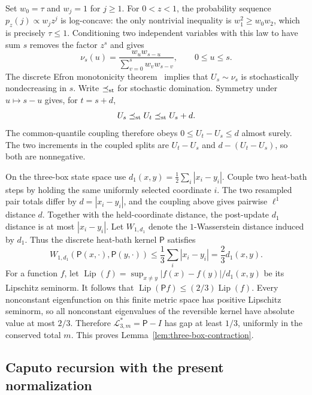 Set $w_0=\tau$ and $w_j=1$ for $j\geq1$.  For $0<z<1$, the probability
sequence $p_z(j)\propto w_jz^j$ is log-concave: the only nontrivial
inequality is $w_1^2\geq w_0w_2$, which is precisely $\tau\leq1$.
Conditioning two independent variables with this law to have sum $s$
removes the factor $z^s$ and gives
\begin{equation}
 \nu_s(u)=\frac{w_u w_{s-u}}
 {\sum_{v=0}^s w_v w_{s-v}},
 \qquad0\leq u\leq s.
 \label{eq:app-split-law}
\end{equation}
The discrete Efron monotonicity theorem~\cite{Efron1965} implies that
$U_s\sim\nu_s$ is stochastically nondecreasing in $s$.  Write
$\preceq_{\rm st}$ for stochastic domination.  Symmetry under
$u\mapsto s-u$ gives, for $t=s+d$,
\begin{equation}
 U_s\preceq_{\rm st}U_t\preceq_{\rm st}U_s+d.
 \label{eq:app-bounded-stochastic-order}
\end{equation}
The common-quantile coupling therefore obeys
$0\leq U_t-U_s\leq d$ almost surely.  The two increments in the coupled
splits are $U_t-U_s$ and $d-(U_t-U_s)$, so both are nonnegative.

On the three-box state space use
$d_1(x,y)=\frac12\sum_i|x_i-y_i|$.  Couple two heat-bath steps by holding
the same uniformly selected coordinate $i$.  The two resampled pair totals
differ by $d=|x_i-y_i|$, and the coupling above gives pairwise
$\ell^1$ distance $d$.  Together with the held-coordinate distance, the
post-update $d_1$ distance is at most $|x_i-y_i|$.  Let $W_{1,d_1}$ denote
the $1$-Wasserstein distance induced by $d_1$.  Thus the discrete heat-bath
kernel $\mathsf P$ satisfies
\begin{equation}
 W_{1,d_1}(\mathsf P(x,\cdot),\mathsf P(y,\cdot))
 \leq\frac13\sum_i|x_i-y_i|=\frac23d_1(x,y).
 \label{eq:app-three-box-wasserstein}
\end{equation}
For a function $f$, let $\operatorname{Lip}(f)
=\sup_{x\ne y}|f(x)-f(y)|/d_1(x,y)$ be its Lipschitz seminorm.  It follows
that $\operatorname{Lip}(\mathsf Pf)\leq(2/3)\operatorname{Lip}(f)$.  Every
nonconstant eigenfunction on this finite metric space has positive
Lipschitz seminorm, so all nonconstant eigenvalues of the reversible kernel
have absolute value at most $2/3$.  Therefore
$\mathcal L^*_{3,m}=\mathsf P-I$ has gap at least $1/3$, uniformly in the
conserved total $m$.  This proves
Lemma~\ref{lem:three-box-contraction}.

\subsection{Caputo recursion with the present normalization}
\label{app:heat-bath-recursion}

